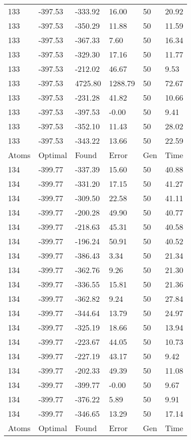 \documentclass{report}
\begin{document}
\begin{appendix}
\begin{longtable}{llllll}
133 & -397.53 & -333.92 & 16.00 & 50 & 20.92 \\
133 & -397.53 & -350.29 & 11.88 & 50 & 11.59 \\
133 & -397.53 & -367.33 & 7.60 & 50 & 16.34 \\
133 & -397.53 & -329.30 & 17.16 & 50 & 11.77 \\
133 & -397.53 & -212.02 & 46.67 & 50 & 9.53 \\
133 & -397.53 & 4725.80 & 1288.79 & 50 & 72.67 \\
133 & -397.53 & -231.28 & 41.82 & 50 & 10.66 \\
133 & -397.53 & -397.53 & -0.00 & 50 & 9.41 \\
133 & -397.53 & -352.10 & 11.43 & 50 & 28.02 \\
133 & -397.53 & -343.22 & 13.66 & 50 & 22.59 \\
Atoms & Optimal & Found & Error & Gen & Time \\
134 & -399.77 & -337.39 & 15.60 & 50 & 40.88 \\
134 & -399.77 & -331.20 & 17.15 & 50 & 41.27 \\
134 & -399.77 & -309.50 & 22.58 & 50 & 41.11 \\
134 & -399.77 & -200.28 & 49.90 & 50 & 40.77 \\
134 & -399.77 & -218.63 & 45.31 & 50 & 40.58 \\
134 & -399.77 & -196.24 & 50.91 & 50 & 40.52 \\
134 & -399.77 & -386.43 & 3.34 & 50 & 21.34 \\
134 & -399.77 & -362.76 & 9.26 & 50 & 21.30 \\
134 & -399.77 & -336.55 & 15.81 & 50 & 21.36 \\
134 & -399.77 & -362.82 & 9.24 & 50 & 27.84 \\
134 & -399.77 & -344.64 & 13.79 & 50 & 24.97 \\
134 & -399.77 & -325.19 & 18.66 & 50 & 13.94 \\
134 & -399.77 & -223.67 & 44.05 & 50 & 10.73 \\
134 & -399.77 & -227.19 & 43.17 & 50 & 9.42 \\
134 & -399.77 & -202.33 & 49.39 & 50 & 11.08 \\
134 & -399.77 & -399.77 & -0.00 & 50 & 9.67 \\
134 & -399.77 & -376.22 & 5.89 & 50 & 9.91 \\
134 & -399.77 & -346.65 & 13.29 & 50 & 17.14 \\
Atoms & Optimal & Found & Error & Gen & Time \\

\end{longtable}
\end{appendix}
\end{document}

